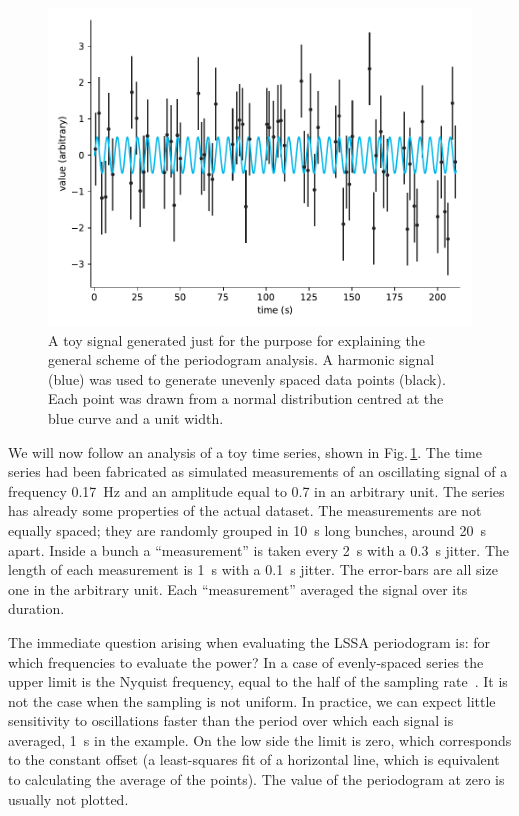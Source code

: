 \begin{figure}
  \centering
  \includegraphics[width=\linewidth]{gfx/axions/basic_signal.pdf}
  \caption{A toy signal generated just for the purpose for explaining the general scheme of the periodogram analysis. A harmonic signal (blue) was used to generate unevenly spaced data points (black). Each point was drawn from a normal distribution centred at the blue curve and a unit width.}\label{fig:basic_signal}
\end{figure}

We will now follow an analysis of a toy time series, shown in Fig.\,\ref{fig:basic_signal}. The time series had been fabricated as simulated measurements of an oscillating signal of a frequency \SI{0.17}{\hertz} and an amplitude equal to \num{0.7} in an arbitrary unit.
The series has already some properties of the actual dataset. The measurements are not equally spaced; they are randomly grouped in \SI{10}{\second} long bunches, around \SI{20}{\second} apart. Inside a bunch a ``measurement'' is taken every \SI{2}{\second} with a \SI{0.3}{\second} jitter. The length of each measurement is \SI{1}{\second} with a \SI{0.1}{\second} jitter. The error-bars are all size one in the arbitrary unit. Each ``measurement'' averaged the signal over its duration.

The immediate question arising when evaluating the LSSA periodogram is: for which frequencies to evaluate the power? In a case of evenly-spaced series the upper limit is the Nyquist frequency, equal to the half of the sampling rate~\cite{Shannon1949}.
It is not the case when the sampling is not uniform. In practice, we can expect little sensitivity to oscillations faster than the period over which each signal is averaged, \SI{1}{\second} in the example. On the low side the limit is zero, which corresponds to the constant offset (a least-squares fit of a horizontal line, which is equivalent to calculating the average of the points). The value of the periodogram at zero is usually not plotted.

